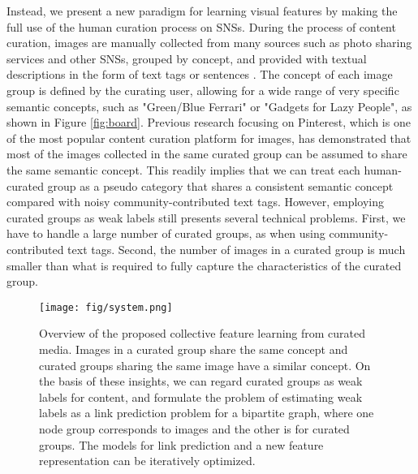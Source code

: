 \documentclass[letterpaper]{article} %
\begin{document}
Instead, we present a new paradigm for learning visual features by making the full use of the human curation process on SNSs.
%
During the process of content curation, images are manually collected from many sources such as photo sharing services and other SNSs, grouped by concept, and provided with textual descriptions in the form of text tags or sentences \cite{Duh2012,Zhong2015}.
%
The concept of each image group is defined by the curating user, allowing for a wide range of very specific semantic concepts, such as "Green/Blue Ferrari" or "Gadgets for Lazy People", as shown in Figure \ref{fig:board}.
%
Previous research \cite{Zhong2015} focusing on Pinterest, which is one of the most popular content curation platform for images, has demonstrated that most of the images collected in the same curated group can be assumed to share the same semantic concept.
%
This readily implies that we can treat each human-curated group as a pseudo category that shares a consistent semantic concept compared with noisy community-contributed text tags.
%
However, employing curated groups as weak labels still presents several technical problems. First, we have to handle a large number of curated groups, as when using community-contributed text tags. Second, the number of images in a curated group is much smaller than what is required to fully capture the characteristics of the curated group.

\begin{figure*}
  \begin{center}
    \texttt{[image: fig/system.png]}
  \end{center}
  \caption{%
    Overview of the proposed collective feature learning from curated media.
    Images in a curated group share the same concept and curated groups sharing the same image have a similar concept.
    On the basis of these insights, we can regard curated groups as weak labels for content, and formulate the problem of estimating weak labels as a link prediction problem for a bipartite graph, where one node group corresponds to images and the other is for curated groups.
    The models for link prediction and a new feature representation can be iteratively optimized.
  }
  \label{fig:system}
\end{figure*}
\end{document}
